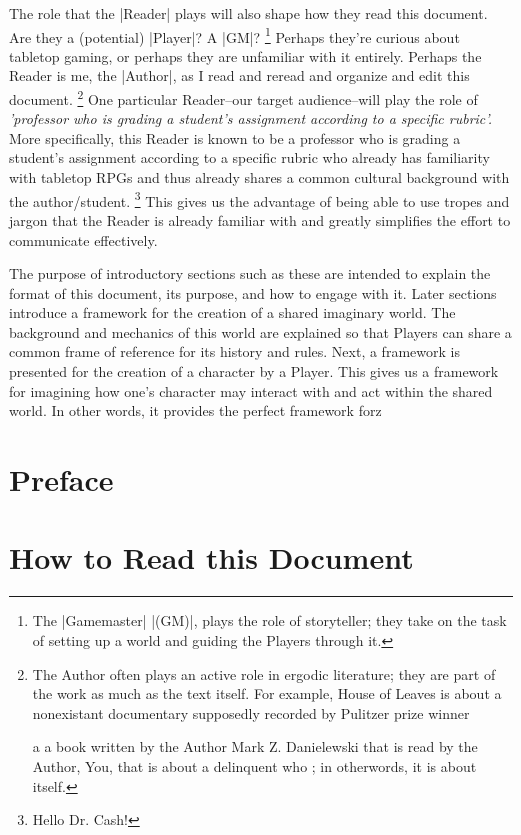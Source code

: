\documentclass[10pt,twoside,twocolumn,openany]{book}
\begin{document}
    The role that the |Reader| plays will also shape how they read this document. 
    Are they a (potential) |Player|? A |GM|?
        \footnote{The |Gamemaster|  |(GM)|, plays the role of storyteller; they take on the task of setting up a world and guiding the Players through it.} 
    Perhaps they're curious about tabletop gaming, or perhaps they are unfamiliar with it entirely. 
    Perhaps the Reader is me, the |Author|, as I read and reread and organize and edit this document.
        \footnote{The Author often plays an active role in ergodic literature; they are part of the work as much as the text itself.
        For example, \color{blue} House \color{black} of Leaves is about a nonexistant documentary supposedly recorded 
        by Pulitzer prize winner 
        
        a a book written by the Author Mark Z. Danielewski that is read by the Author, You, 
        that is about a delinquent who 
        ; in otherwords, it is about itself. }
    One particular Reader--our target audience--will play the role of \textit{'professor who is grading a student's assignment according to a specific rubric'.} 
    More specifically, this Reader is known to be a professor who is grading a student's assignment according to a specific rubric who already has familiarity 
    with tabletop RPGs and thus already shares a common cultural background with the author/student.
        \footnote{Hello Dr. Cash!} 
            This gives us the advantage of being able to use tropes and jargon that the Reader is already familiar with and greatly simplifies 
            the effort to communicate effectively.
    
    The purpose of introductory sections such as these are intended to explain the format of this document, its purpose, and how to engage with it. 
    Later sections introduce a framework for the creation of a shared imaginary world.  
    The background and mechanics of this world are explained so that Players can share a common frame of reference for its history and rules. 
    Next, a framework is presented for the creation of a character by a Player. 
    This gives us a framework for imagining how one's character may interact with and act within the shared world.
    In other words, it provides the perfect framework forz  

\section{Preface}
    \lipsum[1]
\section{How to Read this Document}
    \lipsum[2]
\end{document}

